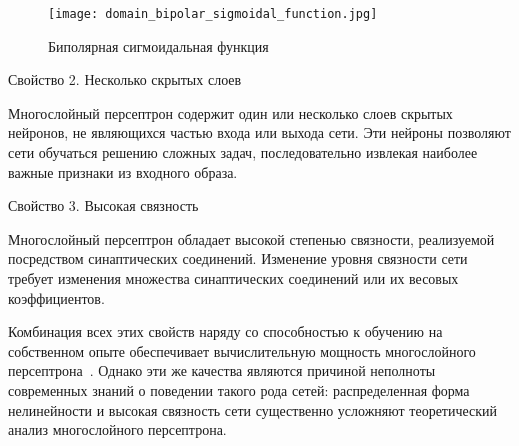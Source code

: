 \begin{figure}[ht]
\centering
  \texttt{[image: domain\_bipolar\_sigmoidal\_function.jpg]}
  \caption{ Биполярная сигмоидальная функция }
  \label{fig:bipolar_sigmoidal_function}
\end{figure}

Свойство 2. Несколько скрытых слоев

Многослойный персептрон содержит один или несколько слоев скрытых нейронов, не являющихся частью входа или выхода сети.
Эти нейроны позволяют сети обучаться решению сложных задач, последовательно извлекая наиболее важные признаки из входного образа.

Свойство 3. Высокая связность

Многослойный персептрон обладает высокой степенью связности, реализуемой посредством синаптических соединений.
Изменение уровня связности сети требует изменения множества синаптических соединений или их весовых коэффициентов.

Комбинация всех этих свойств наряду со способностью к обучению на собственном опыте обеспечивает вычислительную мощность многослойного персептрона~\cite{domain_rosenblatt}.
Однако эти же качества являются причиной неполноты современных знаний о поведении такого рода сетей: распределенная форма нелинейности и высокая связность сети существенно усложняют теоретический анализ многослойного персептрона.
